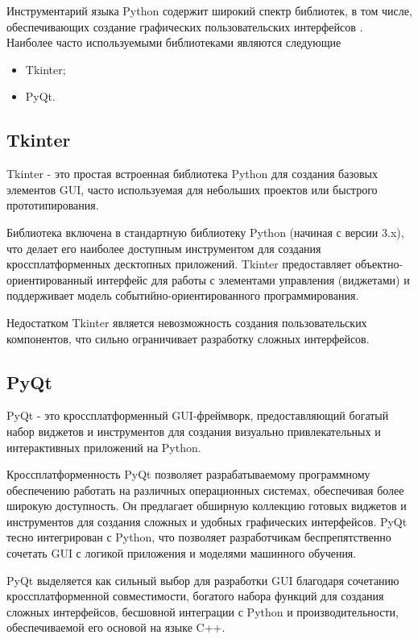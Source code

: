 Инструментарий языка Python содержит широкий спектр библиотек, в том числе,
обеспечивающих создание графических пользовательских интерфейсов
\cite{bib:tools:gui}. 
Наиболее часто используемыми библиотеками являются следующие

\begin{itemize}
  \item Tkinter;
  \item PyQt.
\end{itemize}


\subsection{Tkinter}

Tkinter - это простая встроенная библиотека Python
для создания базовых элементов GUI, часто
используемая для небольших проектов или быстрого
прототипирования. 

Библиотека включена в стандартную библиотеку Python
(начиная с версии 3.x), что делает его наиболее
доступным инструментом для создания
кроссплатформенных десктопных приложений. Tkinter
предоставляет объектно-ориентированный интерфейс для
работы с элементами управления (виджетами) и
поддерживает модель событийно-ориентированного
программирования.

Недостатком Tkinter является невозможность создания пользовательских
компонентов, что сильно ограничивает разработку сложных интерфейсов.

\subsection{PyQt}

PyQt - это кроссплатформенный GUI-фреймворк,
предоставляющий богатый набор виджетов и
инструментов для создания визуально привлекательных
и интерактивных приложений на Python.

Кроссплатформенность PyQt позволяет разрабатываемому
программному обеспечению работать на различных
операционных системах, обеспечивая более широкую
доступность. Он предлагает обширную коллекцию
готовых виджетов и инструментов для создания сложных
и удобных графических интерфейсов. PyQt тесно
интегрирован с Python, что позволяет разработчикам
беспрепятственно сочетать GUI с логикой приложения и
моделями машинного обучения.

PyQt выделяется как сильный выбор для разработки GUI благодаря сочетанию
кроссплатформенной совместимости, богатого набора функций для создания сложных
интерфейсов, бесшовной интеграции с Python и производительности, обеспечиваемой
его основой на языке C++. 

